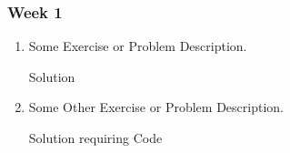 \documentclass[12pt]{amsart}
\begin{document}
\subsubsection{Week 1}
\begin{enumerate}
\item Some Exercise or Problem Description.

Solution
\item Some Other Exercise or Problem Description.

Solution requiring Code
\lstset{language=Erlang}

\end{enumerate}
\end{document}
